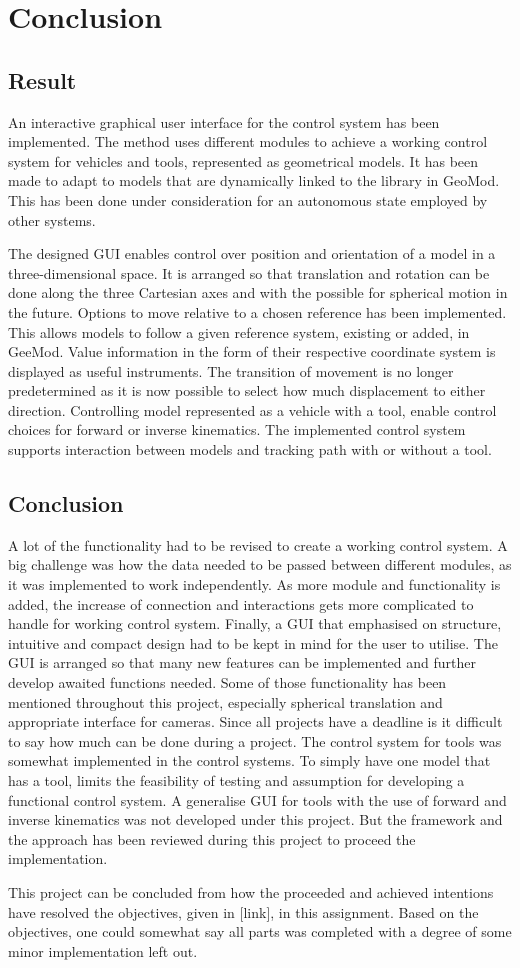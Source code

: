 \chapter{Conclusion}

\section{Result}
An interactive graphical user interface for the control system has been implemented. The method uses different modules to achieve a working control system for vehicles and tools, represented as geometrical models. It has been made to adapt to models that are dynamically linked to the library in GeoMod. This has been done under consideration for an autonomous state employed by other systems. 

The designed GUI enables control over position and orientation of a model in a three-dimensional space. It is arranged so that translation and rotation can be done along the three Cartesian axes and with the possible for spherical motion in the future. Options to move relative to a chosen reference has been implemented. This allows models to follow a given reference system, existing or added, in GeeMod. Value information in the form of their respective coordinate system is displayed as useful instruments. The transition of movement is no longer predetermined as it is now possible to select how much displacement to either direction. Controlling model represented as a vehicle with a tool, enable control choices for forward or inverse kinematics. The implemented control system supports interaction between models and tracking path with or without a tool.

\section{Conclusion}

A lot of the functionality had to be revised to create a working control system. A big challenge was how the data needed to be passed between different modules, as it was implemented to work independently.  As more module and functionality is added, the increase of connection and interactions gets more complicated to handle for working control system.  Finally, a GUI that emphasised on structure, intuitive and compact design had to be kept in mind for the user to utilise. The GUI is arranged so that many new features can be implemented and further develop awaited functions needed. Some of those functionality has been mentioned throughout this project, especially spherical translation and appropriate interface for cameras. Since all projects have a deadline is it difficult to say how much can be done during a project. The control system for tools was somewhat implemented in the control systems. To simply have one model that has a tool, limits the feasibility of testing and assumption for developing a functional control system. A generalise GUI for tools with the use of forward and inverse kinematics was not developed under this project. But the framework and the approach has been reviewed during this project to proceed the implementation. 

This project can be concluded from how the proceeded and achieved intentions have resolved the objectives, given in [link], in this assignment. Based on the objectives, one could somewhat say all parts was completed with a degree of some minor implementation left out.
